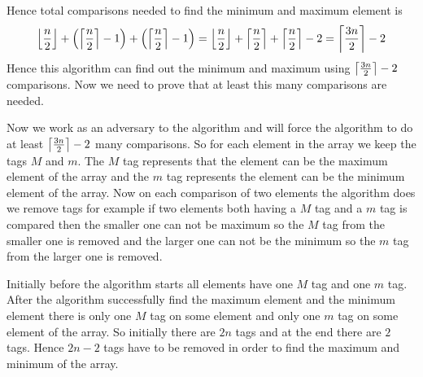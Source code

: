 \documentclass[a4paper, 11pt]{article}
\begin{document}
{Hence total comparisons needed to find the minimum and maximum element is $$\left\lfloor\frac{n}2\right\rfloor+ \left(\left\lceil\frac{n}2\right\rceil-1\right)+\left(\left\lceil\frac{n}2\right\rceil-1\right)=\left\lfloor\frac{n}2\right\rfloor+\left\lceil\frac{n}2\right\rceil+\left\lceil\frac{n}2\right\rceil-2= \left\lceil\frac{3n}2\right\rceil-2 $$Hence this algorithm can find out the minimum and maximum using $\left\lceil\frac{3n}2\right\rceil-2$ comparisons. Now we need to prove that at least this many comparisons are needed. 


Now we work as an adversary to the algorithm and will force the algorithm to do at least $\left\lceil \frac{3n}{2}\right\rceil-2$ many comparisons. So for each element in the array we keep the tags $M$ and $m$. The $M$ tag represents that the element can be the maximum element of the array and the $m$ tag represents the element can be the minimum element of the array. Now on each comparison of two elements the algorithm does we remove tags for example if two elements both having a $M$ tag and a $m$ tag is compared then the smaller one can not be  maximum so the $M$ tag from the smaller one is removed and the larger one can not be the minimum so the $m$ tag from the larger one is removed.

Initially before the algorithm starts all elements have one $M$ tag and one $m$ tag. After the algorithm successfully find the maximum element and the minimum element there is only one $M$ tag on some element and only one $m$ tag on some element of the array. So initially there are $2n$ tags and at the end there are $2$ tags. Hence $2n-2$ tags have to be removed in order to find the maximum and minimum of the array. 

}
\end{document}
